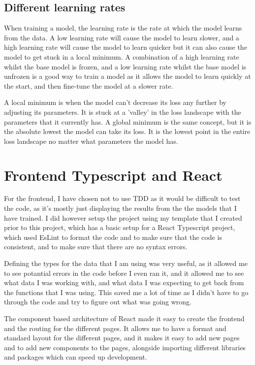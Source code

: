 \documentclass[]{final_report}
\begin{document}
\subsection{Different learning rates}

When training a model, the learning rate is the rate at which the model learns from the data.
A low learning rate will cause the model to learn slower, and a high learning rate will cause the model to learn quicker
but it can also cause the model to get stuck in a local minimum. A combination of a high learning rate whilst the base model is frozen, and a low learning rate whilst the base model is unfrozen is a good way to train a model as it allows the model to learn quickly at the start, and then fine-tune the model at a slower rate.

A local minimum is when the model can't decrease its loss any further by adjusting its parameters.
It is stuck at a 'valley' in the loss landscape with the parameters that it currently has.
A global minimum is the same concept, but it is the absolute lowest the model can take its loss.
It is the lowest point in the entire loss landscape no matter what parameters the model has.


\section{Frontend Typescript and React}

For the frontend, I have chosen not to use TDD as it would be difficult to test the code, as it's mostly just displaying the results from the the models that I have trained. I did however setup the project using my template\cite{TypescriptProjectTemplate} that I created prior to this project, which has a basic setup for a React Typescript project, which used EsLint\cite{EsLint} to format the code and to make sure that the code is consistent, and to make sure that there are no syntax errors.

Defining the types for the data that I am using was very useful, as it allowed me to see potantial errors in the code before I even ran it, and it allowed me to see what data I was working with, and what data I was expecting to get back from the functions that I was using. This saved me a lot of time as I didn't have to go through the code and try to figure out what was going wrong.

The component based architecture of React made it easy to create the frontend and the routing for the different pages. It allows me to have a format and standard layout for the different pages, and it makes it easy to add new pages and to add new components to the pages, alongside importing different libraries and packages which can speed up development.
\end{document}
